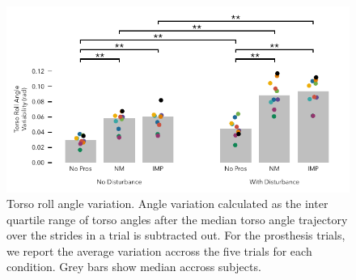 \begin{figure}[h]
    \centering 
    \includegraphics[width=\textwidth]{treadmill_vib_torso_var_y}
    \caption{Torso roll angle variation. Angle variation calculated as the inter
    quartile range of torso angles after the median torso angle trajectory over
    the strides in a trial is subtracted out. For the prosthesis trials, we
    report the average variation accross the five trials for each condition.
    Grey bars show median accross
    subjects.}\label{fig:treadmill_exp_torso_var_y}
\end{figure}
